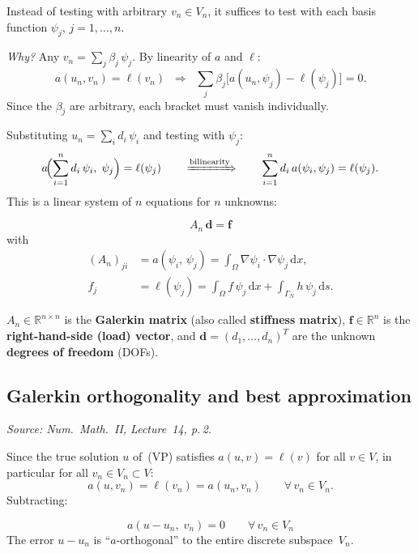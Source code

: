 \documentclass[11pt,a4paper]{article}
\theoremstyle{plain}
\theoremstyle{remark}
\newcommand{\R}{\mathbb{R}}
\newcommand{\dx}{\,\mathrm{d}x}
\newcommand{\ds}{\,\mathrm{d}s}
\newcommand{\Vn}{V_n}
\newcommand{\un}{u_n}
\newcommand{\vn}{v_n}
\let\origsubsection\subsection
\renewcommand{\subsection}{\needspace{6\baselineskip}\origsubsection}
\begin{document}
\begin{keyidea}
Instead of testing with arbitrary $\vn \in \Vn$, it suffices to test
with each basis function $\psi_j$, $j = 1, \ldots, n$.

\medskip\noindent
\textit{Why?}\; Any $\vn = \sum_{j} \beta_j\,\psi_j$.
By linearity of $a$ and $\ell$:
\[
  a(\un,\vn) = \ell(\vn)
  \;\;\Longrightarrow\;\;
  \sum_j \beta_j\bigl[a(\un,\psi_j) - \ell(\psi_j)\bigr] = 0.
\]
Since the $\beta_j$ are arbitrary, each bracket must vanish individually.
\end{keyidea}

Substituting $\un = \sum_{i} d_i\,\psi_i$ and testing with $\psi_j$:
\[
  a\!\Bigl(\sum_{i=1}^n d_i\,\psi_i,\;\psi_j\Bigr)
  = \ell(\psi_j)
  \qquad\xRightarrow{\text{bilinearity}}\qquad
  \sum_{i=1}^n d_i\, a(\psi_i,\psi_j) = \ell(\psi_j).
\]
This is a linear system of $n$ equations for $n$ unknowns:

\begin{equation}
  \boxed{\;A_n\,\mathbf{d} = \mathbf{f}\;}
  \label{eq:system}
\end{equation}
with
\begin{align}
  (A_n)_{ji}
    &= a(\psi_i,\, \psi_j)
     = \int_\Omega \nabla\psi_i \cdot \nabla\psi_j \dx,
    \label{eq:stiffness}\\[4pt]
  f_j
    &= \ell(\psi_j)
     = \int_\Omega f\,\psi_j \dx
       + \int_{\Gamma_N} h\,\psi_j \ds.
    \label{eq:load}
\end{align}

\medskip
$A_n \in \R^{n \times n}$ is the \textbf{Galerkin matrix}
(also called \textbf{stiffness matrix}),
$\mathbf{f} \in \R^n$ is the \textbf{right-hand-side (load) vector},
and $\mathbf{d} = (d_1,\ldots,d_n)^T$ are the unknown
\textbf{degrees of freedom} (DOFs).

\subsection{Galerkin orthogonality and best approximation}

\textit{Source: Num.\ Math.\ II, Lecture~14, p.\,2.}

\medskip\noindent
Since the true solution $u$ of~(VP) satisfies $a(u,v) = \ell(v)$ for all
$v \in V$, in particular for all $\vn \in \Vn \subset V$:
\[
  a(u,\vn) = \ell(\vn) = a(\un,\vn)
  \qquad\forall\,\vn \in \Vn.
\]
Subtracting:

\begin{definition}
\begin{equation}
  \boxed{\;a(u - \un,\;\vn) = 0
         \qquad \forall\, \vn \in \Vn\;}
  \label{eq:galerkin-orth}
\end{equation}
The error $u - \un$ is ``$a$-orthogonal'' to the entire discrete
subspace~$\Vn$.
\end{definition}
\end{document}
